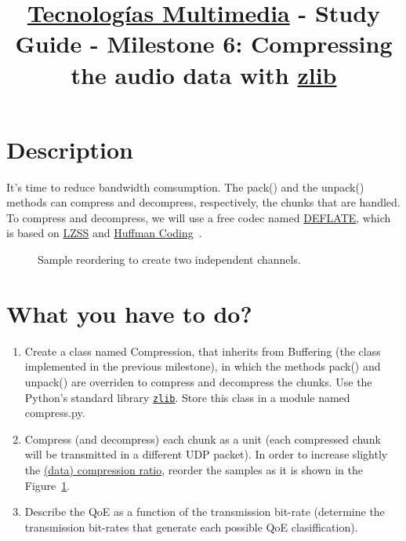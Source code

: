 \title{\href{https://www.ual.es/estudios/grados/presentacion/plandeestudios/asignatura/4015/40154321?idioma=zh_CN}{Tecnologías Multimedia} - Study Guide - Milestone 6: Compressing the audio data with \href{https://zlib.net/}{zlib}}

\maketitle

\section{Description}

It's time to reduce bandwidth comsumption. The pack() and the unpack()
methods can compress and decompress, respectively, the chunks that are
handled. To compress and decompress, we will use a free codec named
\href{https://en.wikipedia.org/wiki/DEFLATE}{DEFLATE}, which is based
on
\href{https://en.wikipedia.org/wiki/Lempel%E2%80%93Ziv%E2%80%93Storer%E2%80%93Szymanski}{LZSS}
  and \href{https://en.wikipedia.org/wiki/Huffman_coding}{Huffman
    Coding}~\cite{nelson96datacompression}.

\begin{figure}
  \begin{center}
  \end{center}
  \caption{Sample reordering to create two independent channels.}
  \label{fig:reordering}
\end{figure}

\section{What you have to do?}

\begin{enumerate}
  
\item Create a class named Compression, that inherits from
  Buffering (the class implemented in the previous milestone),
  in which the methods pack() and unpack() are
  overriden to compress and decompress the chunks. Use the Python's
  standard library
  \href{https://docs.python.org/3/library/zlib.html}{\texttt{zlib}}. Store
  this class in a module named compress.py.
  
\item Compress (and decompress) each chunk as a unit (each compressed
  chunk will be transmitted in a different UDP packet). In order to
  increase slightly the
  \href{https://en.wikipedia.org/wiki/Data_compression_ratio}{(data)
    compression ratio}, reorder the samples as it is shown in the
  Figure~\ref{fig:reordering}.
\item Describe the QoE as a function of the transmission bit-rate
  (determine the transmission bit-rates that generate each possible
  QoE clasiffication).
\end{enumerate}


